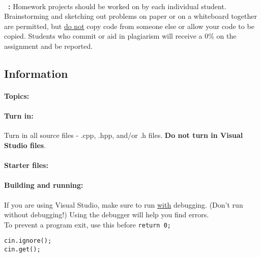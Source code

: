 \footnotesize
~\\ 
\textbf{\laType\ \laAssignment: \laTitle \tab } 
Homework projects should be worked on by each individual student.
Brainstorming and sketching out problems on paper or on a whiteboard
together are permitted, but \underline{do not} copy code from someone else
or allow your code to be copied. Students who commit or aid in plagiarism will
receive a 0\% on the assignment and be reported.

\hrulefill
\normalsize 

    \subsection*{Information}
    
        \paragraph{Topics:} \laTopics

        \paragraph{Turn in:}
            Turn in all source files - .cpp, .hpp, and/or .h files.
            \textbf{Do not turn in Visual Studio files}.

        \paragraph{Starter files:} \laStarterFiles

        \paragraph{Building and running:} If you are using Visual Studio,
            make sure to run \underline{with} debugging. (Don't run without debugging!)
            Using the debugger will help you find errors. \\
            To prevent a program exit, use this before \texttt{return 0;}
\begin{verbatim}
cin.ignore();
cin.get();
\end{verbatim}

